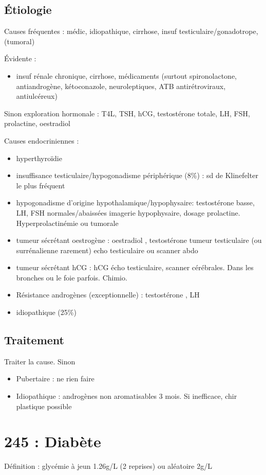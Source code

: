 \documentclass[11pt]{article}
\begin{document}
\subsection{Étiologie}
\label{sec:orgff3dc21}
\begin{tcolorbox}
Causes fréquentes : médic, idiopathique, cirrhose, insuf testiculaire/gonadotrope, (tumoral)
\end{tcolorbox}
Évidente :
\begin{itemize}
\item insuf rénale chronique, cirrhose, médicaments (surtout spironolactone,
antiandrogène, kétoconazole, neuroleptiques, ATB antirétroviraux, antiulcéreux)
\end{itemize}
Sinon exploration hormonale : T4L, TSH, hCG, testostérone totale, LH, FSH,
prolactine, oestradiol

Causes endocriniennes :
\begin{itemize}
\item hyperthyroïdie
\item insuffisance testiculaire/hypogonadisme périphérique (8\%) : sd de Klinefelter
le plus fréquent
\item hypogonadisme d'origine hypothalamique/hypophysaire: testostérone basse, LH,
FSH normales/abaissées \thus imagerie hypophysaire, dosage
prolactine. Hyperprolactinémie ou tumorale
\item tumeur sécrétant oestrogène : oestradiol \inc, testostérone \dec \thus tumeur
testiculaire (ou surrénalienne rarement) \thus echo testiculaire ou scanner
abdo
\item tumeur sécrétant hCG : \inc hCG \thus écho testiculaire, scanner
cérébrales. Dans les bronches ou le foie parfois. Chimio.
\item Résistance androgènes (exceptionnelle) : testostérone \inc, LH \inc
\item idiopathique (25\%)
\end{itemize}

\subsection{Traitement}
\label{sec:orgbc000ca}
Traiter la cause. Sinon
\begin{itemize}
\item Pubertaire : ne rien faire
\item Idiopathique : androgènes non aromatisables 3 mois. Si inefficace, chir
plastique possible
\end{itemize}
\section{245 : Diabète}
\label{sec:orge23eb32}
  \begin{tcolorbox}
Définition : glycémie à jeun \ge 1.26g/L (2 reprises) ou aléatoire \ge 2g/L \footnotemark
\end{tcolorbox}
\end{document}

